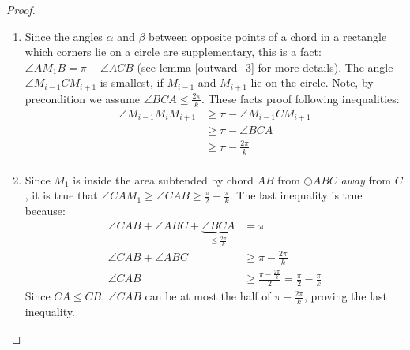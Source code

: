 \begin{proof}
\begin{enumerate}
\item Since the angles $\alpha $ and $\beta $ between opposite points of a chord in a rectangle which corners lie on a circle are supplementary, this is a fact: $\angle{AM_1B}=\pi - \angle{ACB} $ (see lemma \ref{outward_3} for more details).
The angle $\angle{M_{i-1}CM_{i+1}} $ is smallest, if $M_{i-1} $ and $M_{i+1} $ lie on the circle. 
Note, by precondition we assume $\angle{BCA} \leq \frac{2\pi}{k} $.
These facts proof following inequalities:
\begin{equation*}
\begin{split}
 \angle{M_{i-1}M_iM_{i+1}}&\geq \pi - \angle{M_{i-1}CM_{i+1}}\\
 &\geq \pi - \angle{BCA} \\ &\geq \pi - \frac{2\pi}{k}\\
\end{split}
\end{equation*}



\item Since $M_1 $ is inside the area subtended by chord $AB $ from $\bigcirc{ABC} $ \emph{away} from $C $, it is true that $\angle{CAM_1} \geq \angle{CAB} \geq \frac{\pi}{2} -\frac{\pi}{k} $.
The last inequality is true because:
 \begin{equation*}
  \begin{split}
   \angle{CAB}+\angle{ABC}+\underbrace{\angle{BCA}}_{\leq \frac{2\pi}{k}}&=\pi\\
   \angle{CAB}+\angle{ABC} &\geq \pi - \frac{2\pi}{k} \\
   \angle{CAB} &\geq \frac{\pi-\frac{2\pi}{k}}{2}=\frac{\pi}{2}-\frac{\pi}{k}
   \end{split} 
\end{equation*}
Since $CA \leq CB $, $\angle{CAB} $ can be at most the half of $\pi - \frac{2\pi}{k} $, proving the last inequality.

\end{enumerate}
\end{proof}

